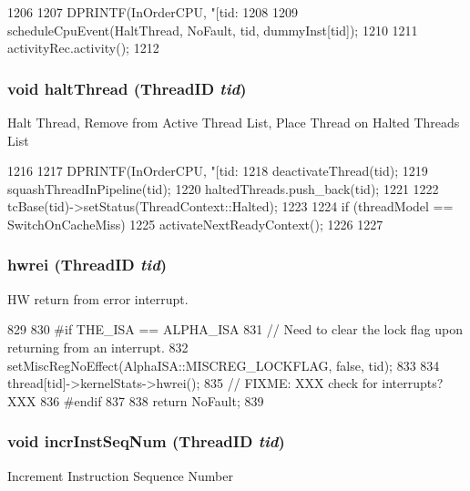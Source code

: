 \begin{DoxyCode}
1206 {
1207     DPRINTF(InOrderCPU, "[tid:%
1208 
1209     scheduleCpuEvent(HaltThread, NoFault, tid, dummyInst[tid]);
1210 
1211     activityRec.activity();
1212 }
\end{DoxyCode}
\hypertarget{classInOrderCPU_a79e607a97980c07fc8d6d0b42a6ee225}{
\subsubsection[{haltThread}]{\setlength{\rightskip}{0pt plus 5cm}void haltThread ({\bf ThreadID} {\em tid})}}
\label{classInOrderCPU_a79e607a97980c07fc8d6d0b42a6ee225}
Halt Thread, Remove from Active Thread List, Place Thread on Halted Threads List 


\begin{DoxyCode}
1216 {
1217     DPRINTF(InOrderCPU, "[tid:%
1218     deactivateThread(tid);
1219     squashThreadInPipeline(tid);   
1220     haltedThreads.push_back(tid);    
1221 
1222     tcBase(tid)->setStatus(ThreadContext::Halted);    
1223 
1224     if (threadModel == SwitchOnCacheMiss) {        
1225         activateNextReadyContext();    
1226     }
1227 }
\end{DoxyCode}
\hypertarget{classInOrderCPU_a3820de4f7e76b56c6d795f27bf49c097}{
\subsubsection[{hwrei}]{ hwrei ({\bf ThreadID} {\em tid})}}
\label{classInOrderCPU_a3820de4f7e76b56c6d795f27bf49c097}
HW return from error interrupt. 


\begin{DoxyCode}
829 {
830 #if THE_ISA == ALPHA_ISA
831     // Need to clear the lock flag upon returning from an interrupt.
832     setMiscRegNoEffect(AlphaISA::MISCREG_LOCKFLAG, false, tid);
833 
834     thread[tid]->kernelStats->hwrei();
835     // FIXME: XXX check for interrupts? XXX
836 #endif
837     
838     return NoFault;
839 }
\end{DoxyCode}
\hypertarget{classInOrderCPU_a411801cd4260db351142d4605f987203}{
\subsubsection[{incrInstSeqNum}]{\setlength{\rightskip}{0pt plus 5cm}void incrInstSeqNum ({\bf ThreadID} {\em tid})}}
\label{classInOrderCPU_a411801cd4260db351142d4605f987203}
Increment Instruction Sequence Number 


